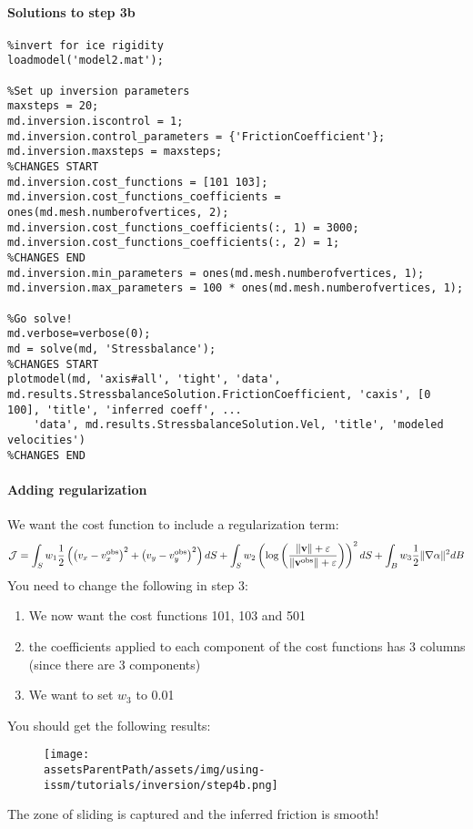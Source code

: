 \paragraph{Solutions to step 3b}
\begin{lstlisting}
%invert for ice rigidity
loadmodel('model2.mat');

%Set up inversion parameters
maxsteps = 20;
md.inversion.iscontrol = 1;
md.inversion.control_parameters = {'FrictionCoefficient'};
md.inversion.maxsteps = maxsteps;
%CHANGES START
md.inversion.cost_functions = [101 103];
md.inversion.cost_functions_coefficients = ones(md.mesh.numberofvertices, 2);
md.inversion.cost_functions_coefficients(:, 1) = 3000;
md.inversion.cost_functions_coefficients(:, 2) = 1;
%CHANGES END
md.inversion.min_parameters = ones(md.mesh.numberofvertices, 1);
md.inversion.max_parameters = 100 * ones(md.mesh.numberofvertices, 1);

%Go solve!
md.verbose=verbose(0);
md = solve(md, 'Stressbalance');
%CHANGES START
plotmodel(md, 'axis#all', 'tight', 'data', md.results.StressbalanceSolution.FrictionCoefficient, 'caxis', [0 100], 'title', 'inferred coeff', ...
	'data', md.results.StressbalanceSolution.Vel, 'title', 'modeled velocities')
%CHANGES END
\end{lstlisting}

\paragraph{Adding regularization}
We want the cost function to include a regularization term:
\begin{equation}
	{\mathcal J}
	=\int_{S} w_1 \dfrac{1}{2}\left(
	\left(v_x-v_x^{\text{obs}}\right)^{2}
	+\left(v_y-v_y^{\text{obs}}\right)^{2}
	\right) dS
	+\int_{S} w_2 \left(\text{log}\left(
	\dfrac{\|{\bf v}\|+\varepsilon}{\|{\bf v}^{\text{obs}}\|+\varepsilon}
	\right) \right)^2 dS
	+\int_{B} w_3
	\dfrac{1}{2} \|\nabla \alpha \|^{2}
	dB
\end{equation}
You need to change the following in step 3:
\begin{enumerate}
	\item We now want the cost functions 101, 103 and 501
	\item the coefficients applied to each component of the cost functions has 3 columns (since there are 3 components)
	\item We want to set $w_3$ to 0.01
\end{enumerate}
You should get the following results:
\begin{figure}[H]
	\begin{center}
		\texttt{[image: \\assetsParentPath/assets/img/using-issm/tutorials/inversion/step4b.png]}
	\end{center}
\end{figure}
The zone of sliding is captured and the inferred friction is smooth!

